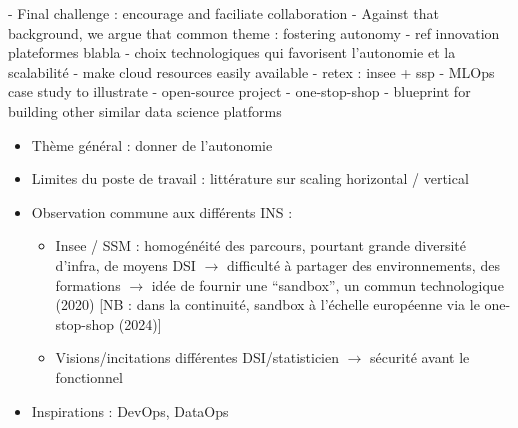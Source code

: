 - Final challenge : encourage and faciliate collaboration
- Against that background, we argue that common theme : fostering autonomy
- ref innovation plateformes blabla
- choix technologiques qui favorisent l'autonomie et la scalabilité
- make cloud resources easily available
- retex : insee + ssp
- MLOps case study to illustrate
- open-source project
- one-stop-shop
- blueprint for building other similar data science platforms 

\begin{itemize}
    \item Thème général : donner de l'autonomie
    \item Limites du poste de travail : littérature sur scaling horizontal / vertical
    \item Observation commune aux différents INS :
    \begin{itemize}
        \item Insee / SSM : homogénéité des parcours, pourtant grande diversité d'infra, de moyens DSI $\rightarrow$ difficulté à partager des environnements, des formations $\rightarrow$ idée de fournir une ``sandbox'', un commun technologique (2020) [NB : dans la continuité, sandbox à l'échelle européenne via le one-stop-shop (2024)]
        \item Visions/incitations différentes DSI/statisticien $\rightarrow$ sécurité avant le fonctionnel
    \end{itemize}
    \item Inspirations : DevOps, DataOps
\end{itemize}